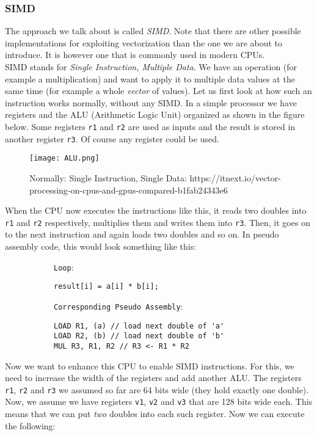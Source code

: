 \documentclass[main.tex]{subfiles}
\begin{document}
\subsubsection{SIMD}
The approach we talk about is called \textit{SIMD}. Note that there are other possible implementations for exploiting vectorization than the one we are about to introduce. It is however one that is commonly used in modern CPUs.\\
SIMD stands for \textit{Single Instruction, Multiple Data}. We have an operation (for example a multiplication) and want to apply it to multiple data values at the same time (for example a whole \textit{vector} of values). Let us first look at how such an instruction works normally, without any SIMD. In a simple processor we have registers and the ALU (Arithmetic Logic Unit) organized as shown in the figure below. Some registers \texttt{r1} and \texttt{r2} are used as inputs and the result is stored in another register \texttt{r3}. Of course any register could be used.
\begin{figure}[H]
    \centering
    \texttt{[image: ALU.png]}
    \caption{Normally: Single Instruction, Single Data: https://itnext.io/vector-processing-on-cpus-and-gpus-compared-b1fab24343e6}
\end{figure}
When the CPU now executes the instructions like this, it reads two doubles into \texttt{r1} and \texttt{r2} respectively, multiplies them and writes them into \texttt{r3}. Then, it goes on to the next instruction and again loads two doubles and so on. In pseudo assembly code, this would look something like this:
\begin{figure}[H]
    \begin{subfigure}[t]{.5\textwidth}
        \texttt{Loop}:
        \begin{verbatim}
result[i] = a[i] * b[i];
        \end{verbatim}
    \end{subfigure}%
    \begin{subfigure}[t]{.6\textwidth}
        \texttt{Corresponding Pseudo Assembly}:
        \begin{verbatim}
LOAD R1, (a) // load next double of 'a'
LOAD R2, (b) // load next double of 'b'
MUL R3, R1, R2 // R3 <- R1 * R2
        \end{verbatim}
    \end{subfigure}
\end{figure}
\noindent Now we want to enhance this CPU to enable SIMD instructions. For this, we need to increase the width of the registers and add another ALU. The registers \texttt{r1}, \texttt{r2} and \texttt{r3} we assumed so far are 64 bits wide (they hold exactly one double). Now, we assume we have registers \texttt{v1}, \texttt{v2} and \texttt{v3} that are 128 bits wide each. This means that we can put \textit{two} doubles into each such register. Now we can execute the following:
\end{document}
